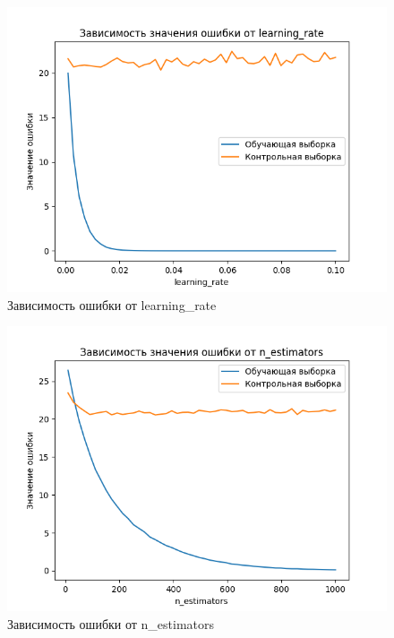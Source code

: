 \begin{figure}[h!]
	\centering
	\includegraphics[scale = 0.8]{img/research_learning_rate.png}
	\caption{Зависимость ошибки от learning\_rate}
	\label{fig:lr}
\end{figure}

\begin{figure}[h!]
	\centering
	\includegraphics[scale = 0.8]{img/research_n_estimators.png}
	\caption{Зависимость ошибки от n\_estimators}
	\label{fig:ne}
\end{figure}

